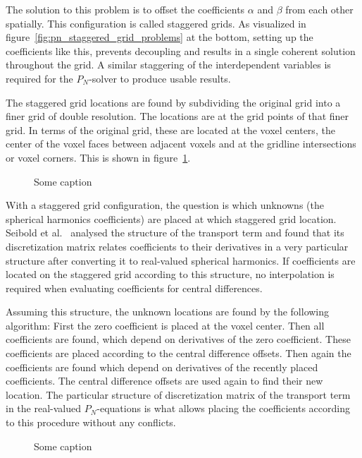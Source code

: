 The solution to this problem is to offset the coefficients $\alpha$ and $\beta$ from each other spatially. This configuration is called staggered grids. As visualized in figure~\ref{fig:pn_staggered_grid_problems} at the bottom, setting up the coefficients like this, prevents decoupling and results in a single coherent solution throughout the grid. A similar staggering of the interdependent variables is required for the $P_N$-solver to produce usable results.

The staggered grid locations are found by subdividing the original grid into a finer grid of double resolution. The locations are at the grid points of that finer grid. In terms of the original grid, these are located at the voxel centers, the center of the voxel faces between adjacent voxels and at the gridline intersections or voxel corners. This is shown in figure~\ref{fig:staggered_grid}.
\begin{figure}[h]
\centering
{}
\caption{Some caption}
\label{fig:staggered_grid}
\end{figure}

With a staggered grid configuration, the question is which unknowns (the spherical harmonics coefficients) are placed at which staggered grid location. Seibold et al.~\cite{Seibold14} analysed the structure of the transport term and found that its discretization matrix relates coefficients to their derivatives in a very particular structure after converting it to real-valued spherical harmonics. If coefficients are located on the staggered grid according to this structure, no interpolation is required when evaluating coefficients for central differences.

Assuming this structure, the unknown locations are found by the following algorithm: First the zero coefficient is placed at the voxel center. Then all coefficients are found, which depend on derivatives of the zero coefficient. These coefficients are placed according to the central difference offsets. Then again the coefficients are found which depend on derivatives of the recently placed coefficients. The central difference offsets are used again to find their new location. The particular structure of discretization matrix of the transport term in the real-valued $P_N$-equations is what allows placing the coefficients according to this procedure without any conflicts. 
\begin{figure}[h]
\centering
{}
\caption{Some caption}
\label{fig:staggered_grid_placement}
\end{figure}

